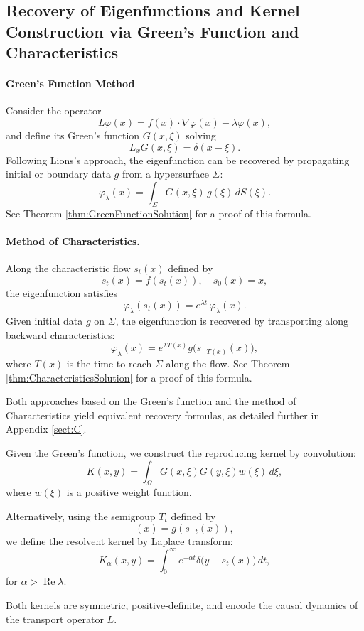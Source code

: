 \documentclass[11pt]{article}
\theoremstyle{plain}
\def\[{\begin{equation}}
\def\]{\end{equation}}
\begin{document}
 

\subsection{Recovery of Eigenfunctions and Kernel Construction via Green’s Function and Characteristics}

 

\paragraph{Green’s Function Method}
Consider the operator
\[
L\varphi(x) = f(x)\cdot\nabla\varphi(x) - \lambda \varphi(x),
\]
and define its Green’s function \(G(x,\xi)\) solving
\[
L_x G(x,\xi) = \delta(x-\xi).
\]
Following Lions's approach, the eigenfunction can be recovered by propagating initial or boundary data \(g\) from a hypersurface \(\Sigma\):
\[
\varphi_\lambda(x) = \int_{\Sigma} G(x,\xi)\,g(\xi)\,dS(\xi).
\]
See Theorem \ref{thm:GreenFunctionSolution} for a proof of this formula.
\paragraph{Method of Characteristics.}
Along the characteristic flow \(s_t(x)\) defined by
\[
\dot{s}_t(x) = f(s_t(x)),\quad s_0(x) = x,
\]
the eigenfunction satisfies
\[
\varphi_\lambda(s_t(x)) = e^{\lambda t}\,\varphi_\lambda(x).
\]
Given initial data \(g\) on \(\Sigma\), the eigenfunction is recovered by transporting along backward characteristics:
\[
\varphi_\lambda(x) = e^{\lambda T(x)} g\bigl(s_{-T(x)}(x)\bigr),
\]
where \(T(x)\) is the time to reach \(\Sigma\) along the flow. See Theorem \ref{thm:CharacteristicsSolution} for a proof of this formula.

Both approaches based on the Green's function and the method of Characteristics yield equivalent recovery formulas, as detailed further in Appendix \ref{sect:C}.

 

Given the Green’s function, we construct the reproducing kernel by convolution:
\[
K(x,y) = \int_{\Omega} G(x,\xi) G(y,\xi) w(\xi)\,d\xi,
\]
where \(w(\xi)\) is a positive weight function.

Alternatively, using the semigroup \(T_t\) defined by
\[
[T_t g](x) = g(s_{-t}(x)),
\]
we define the resolvent kernel by Laplace transform:
\[
K_\alpha(x,y) = \int_0^\infty e^{-\alpha t} \delta\bigl(y-s_t(x)\bigr)\,dt,
\]
for \(\alpha>\operatorname{Re}\lambda\).

Both kernels are symmetric, positive-definite, and encode the causal dynamics of the transport operator \(L\).
\end{document}
